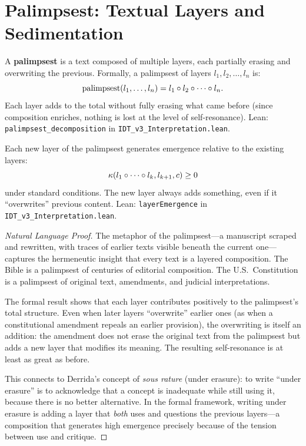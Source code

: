 \section{Palimpsest: Textual Layers and Sedimentation}

\begin{definition}
\label{def:palimpsest}
A \textbf{palimpsest} is a text composed of multiple layers, each partially
erasing and overwriting the previous.  Formally, a palimpsest of layers
$l_1, l_2, \ldots, l_n$ is:
\[
\mathrm{palimpsest}(l_1, \ldots, l_n) = l_1 \circ l_2 \circ \cdots \circ l_n.
\]
Each layer adds to the total without fully erasing what came before (since
composition enriches, nothing is lost at the level of self-resonance).
Lean: \texttt{palimpsest\_decomposition} in \texttt{IDT\_v3\_Interpretation.lean}.
\end{definition}

\begin{theorem}
\label{thm:layer-emergence}
Each new layer of the palimpsest generates emergence relative to the
existing layers:
\[
\kappa(l_1 \circ \cdots \circ l_k, l_{k+1}, c) \geq 0
\]
under standard conditions.  The new layer always adds something, even
if it ``overwrites'' previous content.
Lean: \texttt{layerEmergence} in \texttt{IDT\_v3\_Interpretation.lean}.
\end{theorem}

\begin{proof}[Natural Language Proof]
The metaphor of the palimpsest---a manuscript scraped and rewritten, with
traces of earlier texts visible beneath the current one---captures the
hermeneutic insight that every text is a layered composition.  The Bible
is a palimpsest of centuries of editorial composition.  The U.S.\ Constitution
is a palimpsest of original text, amendments, and judicial interpretations.

The formal result shows that each layer contributes positively to the
palimpsest's total structure.  Even when later layers ``overwrite'' earlier
ones (as when a constitutional amendment repeals an earlier provision),
the overwriting is itself an addition: the amendment does not erase the
original text from the palimpsest but adds a new layer that modifies its
meaning.  The resulting self-resonance is at least as great as before.

This connects to Derrida's concept of \textit{sous rature} (under erasure):
to write ``under erasure'' is to acknowledge that a concept is inadequate
while still using it, because there is no better alternative.  In the
formal framework, writing under erasure is adding a layer that
\emph{both} uses and questions the previous layers---a composition that
generates high emergence precisely because of the tension between use
and critique.
\end{proof}

